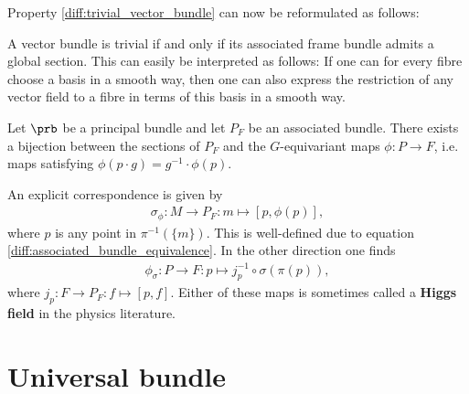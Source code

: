     Property \ref{diff:trivial_vector_bundle} can now be reformulated as follows:
    \begin{property}
        A vector bundle is trivial if and only if its associated frame bundle admits a global section. This can easily be interpreted as follows: If one can for every fibre choose a basis in a smooth way, then one can also express the restriction of any vector field to a fibre in terms of this basis in a smooth way.
    \end{property}

    \begin{property}\label{diff:section_bijection}
        Let $\prb$ be a principal bundle and let $P_F$ be an associated bundle. There exists a bijection between the sections of $P_F$ and the $G$-equivariant maps $\phi:P\rightarrow F$, i.e. maps satisfying $\phi(p\cdot g) = g^{-1}\cdot\phi(p)$.

        An explicit correspondence is given by
        \begin{gather}
            \sigma_\phi:M\rightarrow P_F:m\mapsto[p,\phi(p)],
        \end{gather}
        where $p$ is any point in $\pi^{-1}(\{m\})$. This is well-defined due to equation \eqref{diff:associated_bundle_equivalence}. In the other direction one finds
        \begin{gather}
            \label{diff:section_bijection_phi}
            \phi_\sigma:P\rightarrow F:p\mapsto j_p^{-1}\circ\sigma(\pi(p)),
        \end{gather}
        where $j_p:F\rightarrow P_F:f\mapsto[p,f]$. Either of these maps is sometimes called a \textbf{Higgs field} in the physics literature.
    \end{property}

\section{Universal bundle}

